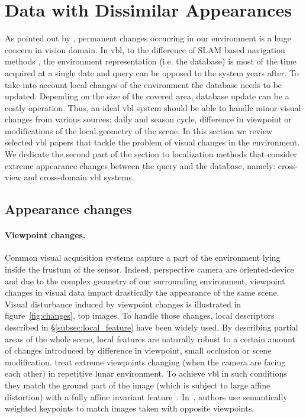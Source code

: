 \section{Data with Dissimilar Appearances}
\label{sec:changing_environment}	

	

	As pointed out by \citet{Lowry2016}, permanent changes occurring in our environment is a huge concern in vision domain. In \ac{vbl}, to the difference of SLAM based navigation methods \citep{Garcia-Fidalgo2015,Lowry2016}, the environment representation (i.e. the database) is most of the time acquired at a single date and query can be opposed to the system years after. To take into account local changes of the environment the database needs to be updated. Depending on the size of the covered area, database update can be a costly operation. Thus, an ideal \ac{vbl} system should be able to handle minor visual changes from various sources: daily and season cycle, difference in viewpoint or modifications of the local geometry of the scene. In this section we review selected \ac{vbl} papers that tackle the problem of visual changes in the environment. We dedicate the second part of the section to localization methods that consider extreme appearance changes between the query and the database, namely: cross-view and cross-domain \ac{vbl} systems.
	
	\subsection{Appearance changes}
	\label{subsec:appearance}
		\paragraph{Viewpoint changes.}
			\label{para:viewpoint}
			Common visual acquisition systems capture a part of the environment lying inside the frustum of the sensor. Indeed, perspective camera are oriented-device and due to the complex geometry of our surrounding environment, viewpoint changes in visual data impact drastically the appearance of the same scene. Visual disturbance induced by viewpoint changes is illustrated in figure~\ref{fig:changes}, top images. To handle those changes, local descriptors described in \S\ref{subsec:local_feature} have been widely used. By describing partial areas of the whole scene, local features are naturally robust to a certain amount of changes introduced by difference in viewpoint, small occlusion or scene modification. \citet{Wan2014} treat extreme viewpoints changing (when the camera are facing each other) in repetitive lunar environment. To achieve \ac{vbl} in such conditions they match the ground part of the image (which is subject to large affine distortion) with a fully affine invariant feature~\citep{Morel2009}. In~\citep{Garg2018a}, authors use semantically weighted keypoints to match images taken with opposite viewpoints.
			
